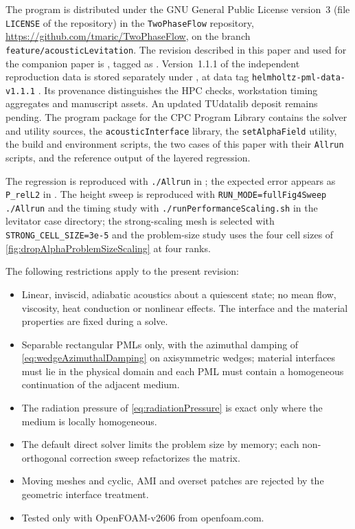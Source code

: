 \documentclass[final,12pt,nopreprintline]{elsarticle}
\newcommand{\code}[1]{\texttt{#1}}
\newcommand{\longhash}[1]{{\def\UrlBreaks{\do\a\do\b\do\c\do\d\do\e\do\f\do\0\do\1\do\2\do\3\do\4\do\5\do\6\do\7\do\8\do\9}\path{#1}}}
\begin{document}
The program is distributed under the GNU General Public License version~3
(file \code{LICENSE} of the repository) in the \code{TwoPhaseFlow}
repository, \url{https://github.com/tmaric/TwoPhaseFlow}, on the branch
\code{feature/acousticLevitation}.  The revision described in this paper and
used for the companion paper is
\longhash{7f00fc55a67aefbcfa88bdb46a4fc378bac0db0c}
\cite{XuLiuMaric2026AcousticSoftware}, tagged as
.  Version~1.1.1 of the independent
reproduction data is stored separately under
, at data tag
\code{helmholtz-pml-data-v1.1.1} \cite{XuMaric2026HelmholtzPMLData}.
Its provenance distinguishes the HPC checks, workstation timing aggregates
and manuscript assets.  An updated TUdatalib deposit remains pending.
The program package for the CPC Program
Library contains the solver and utility sources, the \code{acousticInterface}
library, the \code{setAlphaField} utility, the build and environment scripts,
the two cases of this paper with their \code{Allrun} scripts, and the
reference output of the layered regression.

The regression is reproduced with \code{./Allrun} in
; the
expected error appears as \code{P\_relL2} in
.  The height sweep
is reproduced with \code{RUN\_MODE=fullFig4Sweep ./Allrun} and the timing
study with \code{./runPerformanceScaling.sh} in the levitator case directory;
the strong-scaling mesh is selected with \code{STRONG\_CELL\_SIZE=3e-5} and
the problem-size study uses the four cell sizes of
\cref{fig:dropAlphaProblemSizeScaling} at four ranks.

The following restrictions apply to the present revision:
\begin{itemize}[leftmargin=*]
    \item Linear, inviscid, adiabatic acoustics about a quiescent state; no
    mean flow, viscosity, heat conduction or nonlinear effects.  The
    interface and the material properties are fixed during a solve.
    \item Separable rectangular PMLs only, with the azimuthal damping of
    \cref{eq:wedgeAzimuthalDamping} on axisymmetric wedges; material interfaces must
    lie in the physical domain and each PML must contain a homogeneous
    continuation of the adjacent medium.
    \item The radiation pressure of \cref{eq:radiationPressure} is exact only
    where the medium is locally homogeneous.
    \item The default direct solver limits the problem size by memory; each
    non-orthogonal correction sweep refactorizes the matrix.
    \item Moving meshes and cyclic, AMI and overset patches are rejected by
    the geometric interface treatment.
    \item Tested only with OpenFOAM-v2606 from openfoam.com.
\end{itemize}
\end{document}
